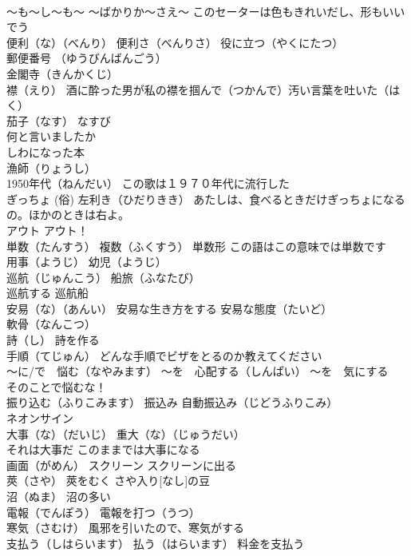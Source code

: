 \documentclass[8pt]{extreport}
\begin{document}
\begin{CJK}{UTF8}{min}
\\	～も～し～も～ ～ばかりか～さえ～ このセーターは色もきれいだし、形もいいでう
\\	便利（な）（べんり） 便利さ（べんりさ） 役に立つ（やくにたつ）
\\	郵便番号 （ゆうびんばんごう）
\\	金閣寺（きんかくじ）
\\	襟（えり） 酒に酔った男が私の襟を掴んで（つかんで）汚い言葉を吐いた（はく）
\\	茄子（なす） なすび
\\	何と言いましたか
\\	しわになった本
\\	漁師（りょうし）
\\	1950年代（ねんだい） この歌は１９７０年代に流行した
\\	ぎっちょ (俗) 左利き（ひだりきき） あたしは、食べるときだけぎっちょになるの。ほかのときは右よ。
\\	アウト アウト！
\\	単数（たんすう） 複数（ふくすう） 単数形 この語はこの意味では単数です
\\	用事（ようじ） 幼児（ようじ）
\\	巡航（じゅんこう） 船旅（ふなたび）
\\	巡航する 巡航船
\\	安易（な）（あんい） 安易な生き方をする 安易な態度（たいど）
\\	軟骨（なんこつ）
\\	詩（し） 詩を作る
\\	手順（てじゅん） どんな手順でビザをとるのか教えてください
\\	～に/で　悩む（なやみます） ～を　心配する（しんぱい） ～を　気にする 
\\	そのことで悩むな！
\\	振り込む（ふりこみます） 振込み 自動振込み（じどうふりこみ）
\\	ネオンサイン
\\	大事（な）（だいじ） 重大（な）（じゅうだい）
\\	それは大事だ このままでは大事になる
\\	画面（がめん） スクリーン スクリーンに出る
\\	莢（さや） 莢をむく さや入り[なし]の豆
\\	沼（ぬま） 沼の多い
\\	電報（でんぽう） 電報を打つ（うつ）
\\	寒気（さむけ） 風邪を引いたので、寒気がする
\\	支払う（しはらいます） 払う（はらいます） 料金を支払う

\end{CJK}
\end{document}
